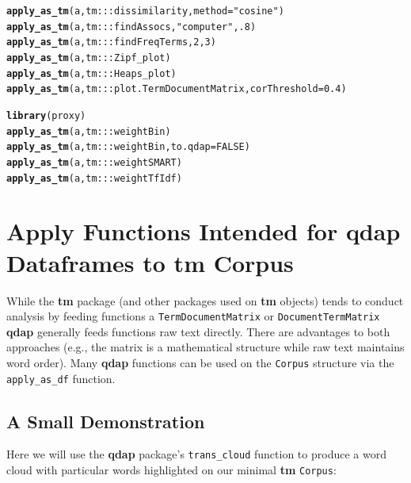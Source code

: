 \documentclass{article}\usepackage[]{graphicx}\usepackage[]{color}
\makeatletter
\newcommand{\hlnum}[1]{\textcolor[rgb]{0.686,0.059,0.569}{#1}}%
\newcommand{\hlstr}[1]{\textcolor[rgb]{0.192,0.494,0.8}{#1}}%
\newcommand{\hlstd}[1]{\textcolor[rgb]{0.345,0.345,0.345}{#1}}%
\newcommand{\hlkwc}[1]{\textcolor[rgb]{0.333,0.667,0.333}{#1}}%
\newcommand{\hlkwd}[1]{\textcolor[rgb]{0.737,0.353,0.396}{\textbf{#1}}}%
\newenvironment{kframe}{%
 \def\at@end@of@kframe{}%
 \ifinner\ifhmode%
  \def\at@end@of@kframe{\end{minipage}}%
  \begin{minipage}{\columnwidth}%
 \fi\fi%
 \def\FrameCommand##1{\hskip\@totalleftmargin \hskip-\fboxsep
 \colorbox{shadecolor}{##1}\hskip-\fboxsep
     \hskip-\linewidth \hskip-\@totalleftmargin \hskip\columnwidth}%
 \MakeFramed {\advance\hsize-\width
   \@totalleftmargin\z@ \linewidth\hsize
   \@setminipage}}%
 {\par\unskip\endMakeFramed%
 \at@end@of@kframe}
\newenvironment{knitrout}{}{} %
\makeatother
\begin{document}
\begin{knitrout}
\color{fgcolor}\begin{kframe}
\begin{alltt}
\hlkwd{apply_as_tm}\hlstd{(a, tm:::dissimilarity,} \hlkwc{method} \hlstd{=} \hlstr{"cosine"}\hlstd{)}
\hlkwd{apply_as_tm}\hlstd{(a, tm:::findAssocs,} \hlstr{"computer"}\hlstd{,} \hlnum{.8}\hlstd{)}
\hlkwd{apply_as_tm}\hlstd{(a, tm:::findFreqTerms,} \hlnum{2}\hlstd{,} \hlnum{3}\hlstd{)}
\hlkwd{apply_as_tm}\hlstd{(a, tm:::Zipf_plot)}
\hlkwd{apply_as_tm}\hlstd{(a, tm:::Heaps_plot)}
\hlkwd{apply_as_tm}\hlstd{(a, tm:::plot.TermDocumentMatrix,} \hlkwc{corThreshold} \hlstd{=} \hlnum{0.4}\hlstd{)}

\hlkwd{library}\hlstd{(proxy)}
\hlkwd{apply_as_tm}\hlstd{(a, tm:::weightBin)}
\hlkwd{apply_as_tm}\hlstd{(a, tm:::weightBin,} \hlkwc{to.qdap} \hlstd{=} \hlnum{FALSE}\hlstd{)}
\hlkwd{apply_as_tm}\hlstd{(a, tm:::weightSMART)}
\hlkwd{apply_as_tm}\hlstd{(a, tm:::weightTfIdf)}
\end{alltt}
\end{kframe}
\end{knitrout}


\section{Apply Functions Intended for qdap Dataframes to tm Corpus}

While the \textbf{tm} package (and other packages used on \textbf{tm} objects) tends to conduct analysis by feeding functions a \texttt{TermDocumentMatrix} or \texttt{DocumentTermMatrix} \textbf{qdap} generally feeds functions raw text directly.  There are advantages to both approaches (e.g., the matrix is a mathematical structure while raw text maintains word order).  Many \textbf{qdap} functions can be used on the \texttt{Corpus} structure via the \texttt{apply\_as\_df} function.    

\subsection{A Small Demonstration}

Here we will use the \textbf{qdap} package's \texttt{trans\_cloud} function to produce a word cloud with particular words highlighted on our minimal \textbf{tm} \texttt{Corpus}:
\end{document}

